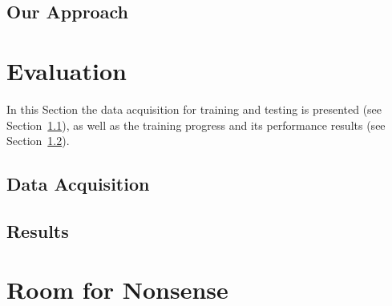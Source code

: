 \documentclass[a4paper,11pt]{article}
\begin{document}
\subsection{Our Approach}
\label{sec:deepvo:approach}


\section{Evaluation}
\label{sec:evaluation}
In this Section the data acquisition for training and testing is presented (see Section~\ref{sec:evaluation:data}), as well as the training progress and its performance results (see Section~\ref{sec:evaluation:results}).


\subsection{Data Acquisition}
\label{sec:evaluation:data}


\subsection{Results}
\label{sec:evaluation:results}


\section{Room for Nonsense}
\label{sec:nonsense}


\newpage
\printbibliography
\end{document}
